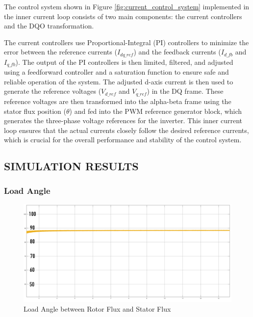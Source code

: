 The control system shown in Figure \ref{fig:current_control_system} implemented in the inner current loop consists of two main components: the current controllers and the DQO transformation.

The current controllers use Proportional-Integral (PI) controllers to minimize the error between the reference currents ($I_{dq\_{ref}}$) and the feedback currents ($I_{d\_fb}$ and $I_{q\_fb}$). The output of the PI controllers is then limited, filtered, and adjusted using a feedforward controller and a saturation function to ensure safe and reliable operation of the system. The adjusted d-axis current is then used to generate the reference voltages ($V_{d\_{ref}}$ and $V_{q\_{ref}}$) in the DQ frame. These reference voltages are then transformed into the alpha-beta frame using the stator flux position ($\theta$) and fed into the PWM reference generator block, which generates the three-phase voltage references for the inverter. This inner current loop ensures that the actual currents closely follow the desired reference currents, which is crucial for the overall performance and stability of the control system.



\subsection{SIMULATION RESULTS}


\subsubsection{Load Angle}


\begin{figure}[H]
	\centering
	\includegraphics[width=6in]{sections/section3/images/simulationResutls/LoadAngle.png}
	\caption{Load Angle between Rotor Flux and Stator Flux}
	\label{fig:load_angle_1}
\end{figure}

